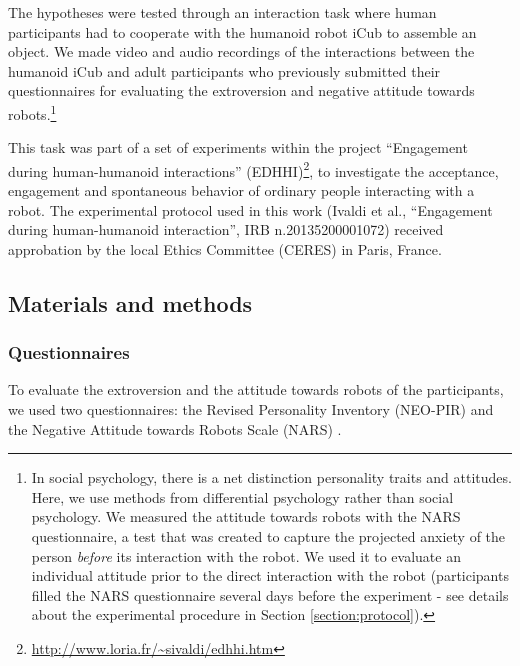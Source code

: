 \medskip
The hypotheses were tested through an interaction task where human participants had to cooperate with the humanoid robot iCub \cite{icub2013} to assemble an object. We made video and audio recordings of the interactions between the humanoid iCub and adult participants who previously submitted their questionnaires for evaluating the extroversion and negative attitude towards robots.\footnote{In social psychology, there is a net distinction personality traits and attitudes. Here, we use methods from differential psychology rather than social psychology. We measured the attitude towards robots with the NARS questionnaire, a test that was created to capture the projected anxiety of the person \textit{before} its interaction with the robot. We used it to evaluate an individual attitude prior to the direct interaction with the robot (participants filled the NARS questionnaire several days before the experiment - see details about the experimental procedure in Section \ref{section:protocol}).}

This task was part of a set of experiments within the project ``Engagement during human-humanoid interactions'' (EDHHI)\footnote{\url{http://www.loria.fr/~sivaldi/edhhi.htm}}, to investigate the acceptance, engagement and spontaneous behavior of ordinary people interacting with a robot.
The experimental protocol used in this work (Ivaldi et al., ``Engagement during human-humanoid interaction'', IRB n.20135200001072) received approbation by the local Ethics Committee (CERES) in Paris, France.



\subsection{Materials and methods}\label{sec:material}


\subsubsection{Questionnaires}

To evaluate the extroversion and the attitude towards robots of the participants, we used two questionnaires: the Revised Personality Inventory (NEO-PIR) \cite{NEOPIR1992} and the Negative Attitude towards Robots Scale (NARS) \cite{NARS2006}.

